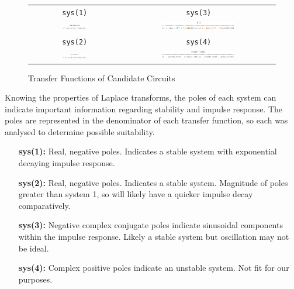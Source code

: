 \documentclass[12pt]{article}
\numberwithin{equation}{section}
\numberwithin{figure}{section}
\numberwithin{table}{section}
\begin{document}
\begin{figure}[ht]
    \centering
    \begin{tabular}{cc}
        \verb+sys(1)+                                              & \verb+sys(3)+                                             \\
        \includegraphics[width=0.28\textwidth]{figures/p3-tf1.png} & \includegraphics[width=0.5\textwidth]{figures/p3-tf3.png} \\
        \verb+sys(2)+                                              & \verb+sys(4)+                                             \\
        \includegraphics[width=0.28\textwidth]{figures/p3-tf2.png} & \includegraphics[width=0.5\textwidth]{figures/p3-tf4.png} \\
    \end{tabular}
    \caption{Transfer Functions of Candidate Circuits\label{fig:p3-tfs}}
\end{figure}

Knowing the properties of Laplace transforms, the poles of each system can
indicate important information regarding stability and impulse response. The
poles are represented in the denominator of each transfer function, so each was
analysed to determine possible suitability.

\begin{itemize}[noitemsep]
    \item[\textbf{sys(1):}] Real, negative poles. Indicates a stable system with exponential
        decaying impulse response.
    \item[\textbf{sys(2):}] Real, negative poles. Indicates a stable system. Magnitude of poles
        greater than system 1, so will likely have a quicker impulse decay comparatively.
    \item[\textbf{sys(3):}] Negative complex conjugate poles indicate sinusoidal components within
        the impulse response. Likely a stable system but oscillation may not be ideal.
    \item[\textbf{sys(4):}] Complex positive poles indicate an unstable system. Not fit for our purposes.
\end{itemize}
\end{document}
